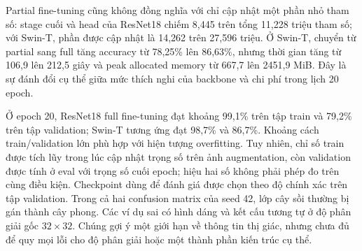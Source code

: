 Partial fine-tuning cũng không đồng nghĩa với chỉ cập nhật một phần nhỏ tham số: stage cuối và head của ResNet18 chiếm 8,445 trên tổng 11,228 triệu tham số; với Swin-T, phần được cập nhật là 14,262 trên 27,596 triệu. Ở Swin-T, chuyển từ partial sang full tăng accuracy từ 78,25\% lên 86,63\%, nhưng thời gian tăng từ 106,9 lên 212,5 giây và peak allocated memory từ 667,7 lên 2451,9 MiB. Đây là sự đánh đổi cụ thể giữa mức thích nghi của backbone và chi phí trong lịch 20 epoch.

Ở epoch 20, ResNet18 full fine-tuning đạt khoảng 99,1\% trên tập train và 79,2\% trên tập validation; Swin-T tương ứng đạt 98,7\% và 86,7\%. Khoảng cách train/validation lớn phù hợp với hiện tượng overfitting. Tuy nhiên, chỉ số train được tích lũy trong lúc cập nhật trọng số trên ảnh augmentation, còn validation được tính ở eval với trọng số cuối epoch; hiệu hai số không phải phép đo trên cùng điều kiện. Checkpoint dùng để đánh giá được chọn theo độ chính xác trên tập validation. Trong cả hai confusion matrix của seed 42, lớp cây sồi thường bị gán thành cây phong. Các ví dụ sai có hình dáng và kết cấu tương tự ở độ phân giải gốc $32\times32$. Chúng gợi ý một giới hạn về thông tin thị giác, nhưng chưa đủ để quy mọi lỗi cho độ phân giải hoặc một thành phần kiến trúc cụ thể.
